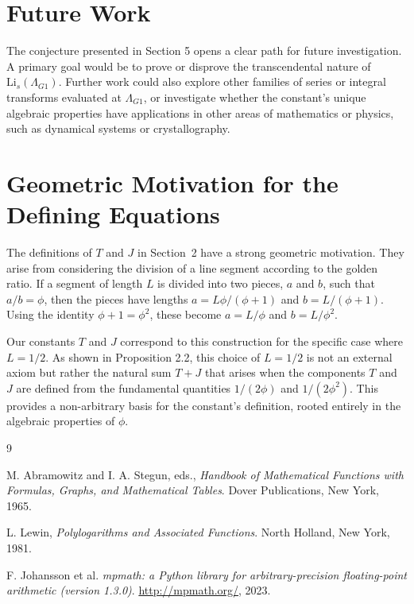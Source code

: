 \documentclass{amsart}
\theoremstyle{plain}
\theoremstyle{definition}
\theoremstyle{remark}
\newcommand{\LambdaG}{\Lambda_{G1}}
\begin{document}
\section{Future Work}
The conjecture presented in Section 5 opens a clear path for future investigation. A primary goal would be to prove or disprove the transcendental nature of $\mathrm{Li}_s(\LambdaG)$. Further work could also explore other families of series or integral transforms evaluated at $\LambdaG$, or investigate whether the constant's unique algebraic properties have applications in other areas of mathematics or physics, such as dynamical systems or crystallography.

\appendix
\section{Geometric Motivation for the Defining Equations}
\label{app:A}
The definitions of $T$ and $J$ in Section~2 have a strong geometric motivation. They arise from considering the division of a line segment according to the golden ratio. If a segment of length $L$ is divided into two pieces, $a$ and $b$, such that $a/b = \phi$, then the pieces have lengths $a = L\phi/(\phi+1)$ and $b=L/(\phi+1)$. Using the identity $\phi+1=\phi^2$, these become $a=L/\phi$ and $b=L/\phi^2$.

Our constants $T$ and $J$ correspond to this construction for the specific case where $L=1/2$. As shown in Proposition 2.2, this choice of $L=1/2$ is not an external axiom but rather the natural sum $T+J$ that arises when the components $T$ and $J$ are defined from the fundamental quantities $1/(2\phi)$ and $1/(2\phi^2)$. This provides a non-arbitrary basis for the constant's definition, rooted entirely in the algebraic properties of $\phi$.

\begin{thebibliography}{9}

M. Abramowitz and I. A. Stegun, eds.,
\textit{Handbook of Mathematical Functions with Formulas, Graphs, and Mathematical Tables}.
Dover Publications, New York, 1965.

L. Lewin,
\textit{Polylogarithms and Associated Functions}.
North Holland, New York, 1981.

F. Johansson et al.
\textit{mpmath: a Python library for arbitrary-precision floating-point arithmetic (version 1.3.0)}.
\url{http://mpmath.org/}, 2023.

\end{thebibliography}
\end{document}
